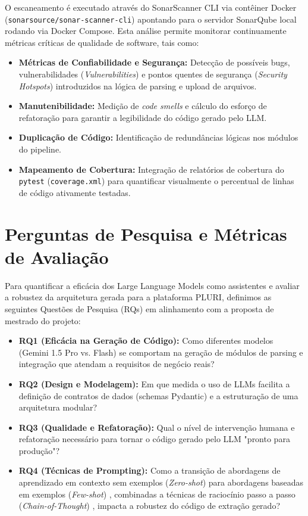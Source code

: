 \documentclass[sigconf]{acmart}
\begin{document}
O escaneamento é executado através do SonarScanner CLI via contêiner Docker (\lstinline{sonarsource/sonar-scanner-cli}) apontando para o servidor SonarQube local rodando via Docker Compose. Esta análise permite monitorar continuamente métricas críticas de qualidade de software, tais como:
\begin{itemize}
\item \textbf{Métricas de Confiabilidade e Segurança:} Detecção de possíveis bugs, vulnerabilidades (\textit{Vulnerabilities}) e pontos quentes de segurança (\textit{Security Hotspots}) introduzidos na lógica de parsing e upload de arquivos.
\item \textbf{Manutenibilidade:} Medição de \textit{code smells} e cálculo do esforço de refatoração para garantir a legibilidade do código gerado pelo LLM.
\item \textbf{Duplicação de Código:} Identificação de redundâncias lógicas nos módulos do pipeline.
\item \textbf{Mapeamento de Cobertura:} Integração de relatórios de cobertura do \lstinline{pytest} (\lstinline{coverage.xml}) para quantificar visualmente o percentual de linhas de código ativamente testadas.
\end{itemize}


\section{Perguntas de Pesquisa e Métricas de Avaliação}
Para quantificar a eficácia dos Large Language Models como assistentes e avaliar a robustez da arquitetura gerada para a plataforma PLURI, definimos as seguintes Questões de Pesquisa (RQs) em alinhamento com a proposta de mestrado do projeto:
\begin{itemize}
\item \textbf{RQ1 (Eficácia na Geração de Código):} Como diferentes modelos (Gemini 1.5 Pro vs. Flash) se comportam na geração de módulos de parsing e integração que atendam a requisitos de negócio reais?
\item \textbf{RQ2 (Design e Modelagem):} Em que medida o uso de LLMs facilita a definição de contratos de dados (schemas Pydantic) e a estruturação de uma arquitetura modular?
\item \textbf{RQ3 (Qualidade e Refatoração):} Qual o nível de intervenção humana e refatoração necessário para tornar o código gerado pelo LLM "pronto para produção"?
\item \textbf{RQ4 (Técnicas de Prompting):} Como a transição de abordagens de aprendizado em contexto sem exemplos (\textit{Zero-shot}) para abordagens baseadas em exemplos (\textit{Few-shot}) \cite{brown2020language}, combinadas a técnicas de raciocínio passo a passo (\textit{Chain-of-Thought}) \cite{wei2022chain}, impacta a robustez do código de extração gerado?
\end{itemize}
\end{document}
